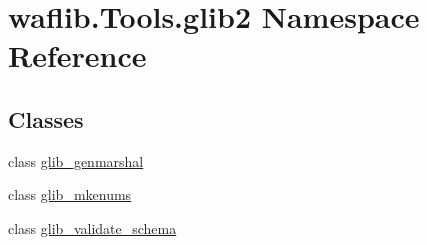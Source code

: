 \hypertarget{namespacewaflib_1_1_tools_1_1glib2}{}\section{waflib.\+Tools.\+glib2 Namespace Reference}
\label{namespacewaflib_1_1_tools_1_1glib2}
\subsection*{Classes}
\begin{DoxyCompactItemize}
\item 
class \hyperlink{classwaflib_1_1_tools_1_1glib2_1_1glib__genmarshal}{glib\+\_\+genmarshal}
\item 
class \hyperlink{classwaflib_1_1_tools_1_1glib2_1_1glib__mkenums}{glib\+\_\+mkenums}
\item 
class \hyperlink{classwaflib_1_1_tools_1_1glib2_1_1glib__validate__schema}{glib\+\_\+validate\+\_\+schema}
\end{DoxyCompactItemize}
